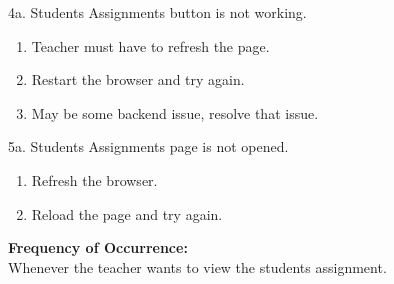 \documentclass[12pt]{article}
\begin{document}
4a. Students Assignments button is not working.
\begin{enumerate}
\item Teacher must have to refresh the page.
\item Restart the browser and try again.
\item May be some backend issue, resolve that issue.
\end{enumerate}
5a. Students Assignments page is not opened.
\begin{enumerate}
\item Refresh the browser.
\item Reload the page and try again.
\end{enumerate}
\textbf{Frequency of Occurrence:}\\
Whenever the teacher wants to view the students assignment.
\end{document}

